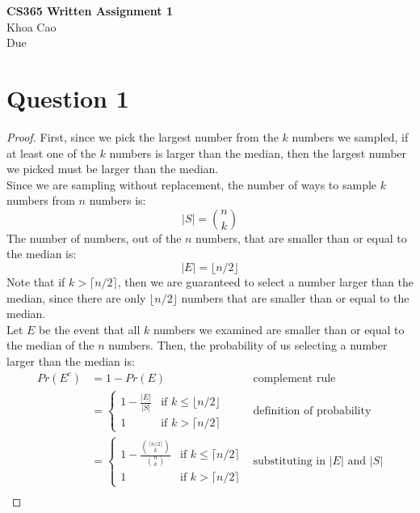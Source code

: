 \documentclass[11pt]{article}
\begin{document}
\begin{center}
    \textbf{CS365 Written Assignment 1} \\
    Khoa Cao \\
    Due 
\end{center}

\section*{Question 1}
\begin{proof}
	First, since we pick the largest number from the $k$ numbers we sampled, if at least one of the $k$ numbers is larger than the median, then the largest number we picked must be larger than the median. \\
	Since we are sampling without replacement, the number of ways to sample $k$ numbers from $n$ numbers is:
	\[
		|S| = {n \choose k}
	\]
	The number of numbers, out of the $n$ numbers, that are smaller than or equal to the median is:
	\[
		|E| = {\lfloor n/2 \rfloor}
	\]
	Note that if $k > \lceil n/2 \rceil$, then we are guaranteed to select a number larger than the median, since there are only $\lfloor n/2 \rfloor$ numbers that are smaller than or equal to the median. \\
	Let $E$ be the event that all $k$ numbers we examined are smaller than or equal to the median of the $n$ numbers.
	Then, the probability of us selecting a number larger than the median is:
	\begin{align*}
		Pr(E^c) &= 1 - Pr(E) &\text{complement rule} \\
		&= \begin{cases}
			1 - \frac{|E|}{|S|} & \text{if } k \leq \lfloor n/2 \rfloor \\
			1 & \text{if } k > \lceil n/2 \rceil
		\end{cases} & \text{definition of probability} \\
		&= \begin{cases}
			1 - \frac{{\lceil n/2 \rceil \choose k}}{{n \choose k}} & \text{if } k \leq \lceil n/2 \rceil \\
			1 & \text{if } k > \lceil n/2 \rceil
		\end{cases} & \text{substituting in } |E| \text{ and } |S| \\
	\end{align*}
\end{proof}

\newpage
\end{document}
